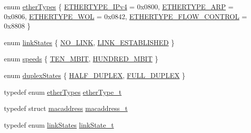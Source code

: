 \begin{DoxyCompactItemize}
\item 
enum \mbox{\hyperlink{group__ethernet_gae9b220b061a72fe29cc1e3913a1f73cb}{ether\+Types}} \{ \mbox{\hyperlink{group__ethernet_ggae9b220b061a72fe29cc1e3913a1f73cbab2b889adbcd85458d549249e8f1d3bcd}{E\+T\+H\+E\+R\+T\+Y\+P\+E\+\_\+\+I\+Pv4}} = 0x0800, 
\mbox{\hyperlink{group__ethernet_ggae9b220b061a72fe29cc1e3913a1f73cbab78454b9340abb34bd92a17f01a8060d}{E\+T\+H\+E\+R\+T\+Y\+P\+E\+\_\+\+A\+RP}} = 0x0806, 
\mbox{\hyperlink{group__ethernet_ggae9b220b061a72fe29cc1e3913a1f73cba421e1f3ba7f0c80d1e22742b7ab7dc56}{E\+T\+H\+E\+R\+T\+Y\+P\+E\+\_\+\+W\+OL}} = 0x0842, 
\mbox{\hyperlink{group__ethernet_ggae9b220b061a72fe29cc1e3913a1f73cba2a2f46cbbd4ecefb4d852d7ca0579f19}{E\+T\+H\+E\+R\+T\+Y\+P\+E\+\_\+\+F\+L\+O\+W\+\_\+\+C\+O\+N\+T\+R\+OL}} = 0x8808
 \}
\item 
enum \mbox{\hyperlink{group__ethernet_gad146c3b2a237ecd80026880aef2cbb7e}{link\+States}} \{ \mbox{\hyperlink{group__ethernet_gad146c3b2a237ecd80026880aef2cbb7eaba43fad8ee5185f12ea31f7dcb843709}{N\+O\+\_\+\+L\+I\+NK}}, 
\mbox{\hyperlink{group__ethernet_gad146c3b2a237ecd80026880aef2cbb7eae089385bb92f30d1c9c6cb4f1fb1d226}{L\+I\+N\+K\+\_\+\+E\+S\+T\+A\+B\+L\+I\+S\+H\+ED}}
 \}
\item 
enum \mbox{\hyperlink{group__ethernet_gad51ff69ce00ee5c869723c572db0eefd}{speeds}} \{ \mbox{\hyperlink{group__ethernet_gad51ff69ce00ee5c869723c572db0eefda283ccbbfdcfbf2e40a4a0f49f94d24ec}{T\+E\+N\+\_\+\+M\+B\+IT}}, 
\mbox{\hyperlink{group__ethernet_gad51ff69ce00ee5c869723c572db0eefdad16b512761cace49b5a8f574629747f0}{H\+U\+N\+D\+R\+E\+D\+\_\+\+M\+B\+IT}}
 \}
\item 
enum \mbox{\hyperlink{group__ethernet_ga07afd358acdd48dc34d82f6ed379316f}{duplex\+States}} \{ \mbox{\hyperlink{group__ethernet_ga07afd358acdd48dc34d82f6ed379316faea07ca15f5869b4c98b70763be15f6d8}{H\+A\+L\+F\+\_\+\+D\+U\+P\+L\+EX}}, 
\mbox{\hyperlink{group__ethernet_ga07afd358acdd48dc34d82f6ed379316fa7dee6a082d2fe35451a6727e3585e499}{F\+U\+L\+L\+\_\+\+D\+U\+P\+L\+EX}}
 \}
\item 
typedef enum \mbox{\hyperlink{group__ethernet_gae9b220b061a72fe29cc1e3913a1f73cb}{ether\+Types}} \mbox{\hyperlink{group__ethernet_ga467703afefdcaf7893a7da3eb63280ed}{ether\+Type\+\_\+t}}
\item 
typedef struct \mbox{\hyperlink{structmacaddress}{macaddress}} \mbox{\hyperlink{group__ethernet_gacb865bcbf50a6c8cef05581bfabff373}{macaddress\+\_\+t}}
\item 
typedef enum \mbox{\hyperlink{group__ethernet_gad146c3b2a237ecd80026880aef2cbb7e}{link\+States}} \mbox{\hyperlink{group__ethernet_ga0e02d2c1291711df8a3ffc6f5c8aab98}{link\+State\+\_\+t}}

\end{DoxyCompactItemize}
